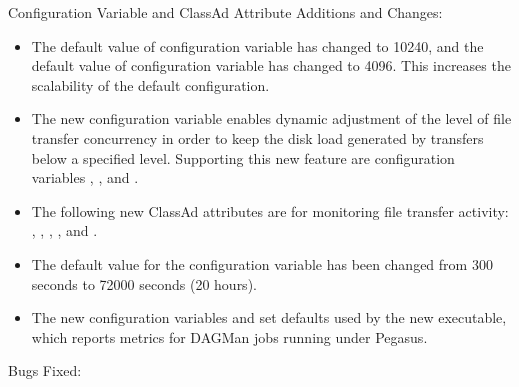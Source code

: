 \noindent Configuration Variable and ClassAd Attribute Additions and Changes:

\begin{itemize}

\item The default value of configuration variable
 has changed to 10240,
and the default value of configuration variable 
 has changed to 4096.
This increases the scalability of the default configuration.

\item The new configuration variable
 enables dynamic
adjustment of the level of file transfer concurrency in order to
keep the disk load generated by transfers below a specified level.
Supporting this new feature are configuration variables
,
, and
.

\item The following new  ClassAd attributes are for
monitoring file transfer activity:
,
,
,
, and
.

\item The default value for the configuration variable
 has been changed from 300 seconds to
72000 seconds (20 hours).

\item The new configuration variables
 and
set defaults used by the new  executable,
which reports metrics for DAGMan jobs running under Pegasus.

\end{itemize}

\noindent Bugs Fixed:

